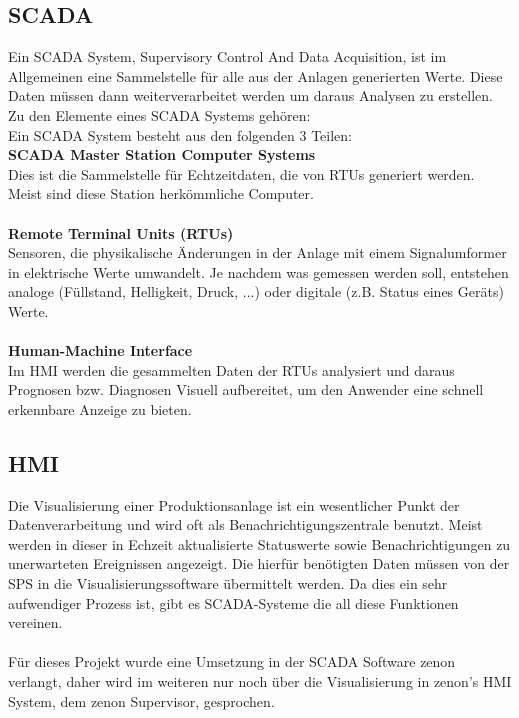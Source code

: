 \subsection{SCADA}
Ein SCADA System, Supervisory Control And Data Acquisition, ist im Allgemeinen eine Sammelstelle für alle aus der Anlagen generierten Werte. Diese Daten müssen dann weiterverarbeitet werden um daraus Analysen zu erstellen.\\
Zu den Elemente eines SCADA Systems gehören:\\
Ein SCADA System besteht aus den folgenden 3 Teilen:
\\
\textbf{SCADA Master Station Computer Systems}\\
Dies ist die Sammelstelle für Echtzeitdaten, die von RTUs generiert werden. Meist sind diese Station herkömmliche Computer.\cite{scada_system} \\ 
\\
\textbf{Remote Terminal Units (RTUs)}\\
Sensoren, die physikalische Änderungen in der Anlage mit einem Signalumformer in elektrische Werte umwandelt. Je nachdem was gemessen werden soll, entstehen analoge (Füllstand, Helligkeit, Druck, ...) oder digitale (z.B. Status eines Geräts) Werte.\cite{scada_system} \\
\\
\textbf{Human-Machine Interface}\\
Im HMI werden die gesammelten Daten der RTUs analysiert und daraus Prognosen bzw. Diagnosen Visuell aufbereitet, um den Anwender eine schnell erkennbare Anzeige zu bieten.\cite{scada_system}

\subsection{HMI}
Die Visualisierung einer Produktionsanlage ist ein wesentlicher Punkt der Datenverarbeitung und wird oft als Benachrichtigungszentrale benutzt. Meist werden in dieser in Echzeit aktualisierte Statuswerte sowie Benachrichtigungen zu unerwarteten Ereignissen angezeigt. Die hierfür benötigten Daten müssen von der SPS in die Visualisierungssoftware übermittelt werden. Da dies ein sehr aufwendiger Prozess ist, gibt es SCADA-Systeme die all diese Funktionen vereinen.\\
\\
Für dieses Projekt wurde eine Umsetzung in der SCADA Software zenon verlangt, daher wird im weiteren nur noch über die Visualisierung in zenon's HMI System, dem zenon Supervisor, gesprochen.\\
\\

